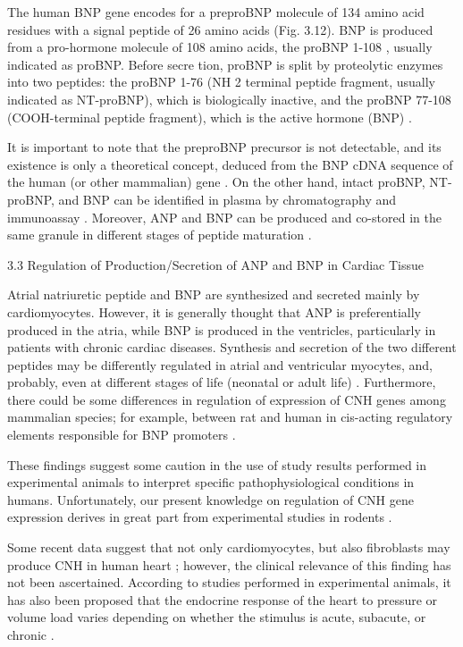 \documentclass[14pt,a4paper,onecolumn]{extarticle}
\begin{document}
The human BNP gene encodes for a preproBNP molecule of 134 amino acid residues with a signal peptide of 26 amino acids (Fig. 3.12). BNP is produced from a pro-hormone molecule of 108 amino acids, the proBNP 1-108 , usually indicated as proBNP. Before secre tion, proBNP is split by proteolytic enzymes into two peptides: the proBNP 1-76 (NH 2 terminal peptide fragment, usually indicated as NT-proBNP), which is biologically inactive, and the proBNP 77-108 (COOH-terminal peptide fragment), which is the active hormone (BNP) \citep{14}.

It is important to note that the preproBNP precursor is not detectable, and its existence is only a theoretical concept, deduced from the BNP cDNA sequence of the human (or other mammalian) gene \citep{14}. On the other hand, intact proBNP, NT-proBNP, and BNP can be identified in plasma by chromatography and immunoassay \citep{14-17}. Moreover, ANP and BNP can be produced and co-stored in the same granule in different stages of peptide maturation \citep{11-13}.

3.3 Regulation of Production/Secretion of ANP and BNP in Cardiac Tissue

Atrial natriuretic peptide and BNP are synthesized and secreted mainly by cardiomyocytes. However, it is generally thought that ANP is preferentially produced in the atria, while BNP is produced in the ventricles, particularly in patients with chronic cardiac diseases. Synthesis and secretion of the two different peptides may be differently regulated in atrial and ventricular myocytes, and, probably, even at different stages of life (neonatal or adult life) \citep{12-14}\citep{18-23}. Furthermore, there could be some differences in regulation of expression of CNH genes among mammalian species; for example, between rat and human in cis-acting regulatory elements responsible for BNP promoters \citep{22}.

These findings suggest some caution in the use of study results performed in experimental animals to interpret specific pathophysiological conditions in humans. Unfortunately, our present knowledge on regulation of CNH gene expression derives in great part from experimental studies in rodents \citep{18-23}.

Some recent data suggest that not only cardiomyocytes, but also fibroblasts may produce CNH in human heart \citep{24}; however, the clinical relevance of this finding has not been ascertained. According to studies performed in experimental animals, it has also been proposed that the endocrine response of the heart to pressure or volume load varies depending on whether the stimulus is acute, subacute, or chronic \citep{12}\citep{13}\citep{18}\citep{22}.
\end{document}

